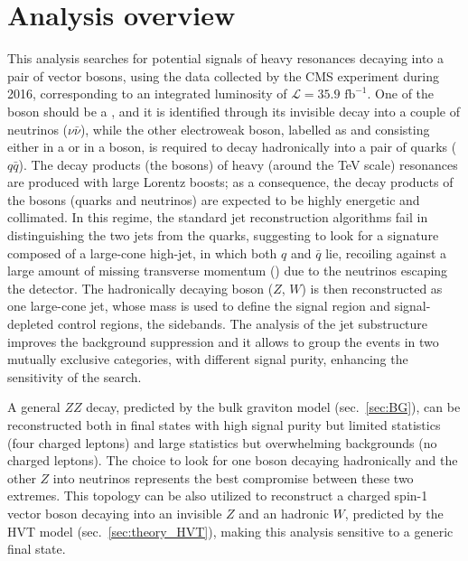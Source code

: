 \section{Analysis overview}
\label{sec:analysis_overview}

This analysis searches for potential signals of heavy resonances decaying into a pair of vector bosons, using the data collected by the CMS experiment during 2016, corresponding to an integrated luminosity of $\mathcal{L}=35.9 \mbox{ fb}^{-1}$. One of the boson should be a \Z, and it is identified through its invisible decay into a couple of neutrinos ($\nu \bar{\nu}$), while the other electroweak boson, labelled as \V and consisting either in a \W or in a \Z boson, is required to decay hadronically into a pair of quarks ($q \bar{q}$). %
The decay products (the bosons) of heavy (around the TeV scale) resonances are produced with large Lorentz boosts; as a consequence, the decay products of the bosons (quarks and neutrinos) are expected to be highly energetic and collimated. In this regime, the standard jet reconstruction algorithms fail in distinguishing the two jets from the quarks, suggesting to look for a signature composed of a large-cone high-\pt jet, in which both $q$ and $\bar{q}$ lie, recoiling against a large amount of missing transverse momentum (\met) due to the neutrinos escaping the detector. The hadronically decaying boson ($Z$, $W$) is then reconstructed as one large-cone jet, whose mass is used to define the signal region and signal-depleted control regions, the sidebands. %
The analysis of the jet substructure improves the background suppression and it allows to group the events in two mutually exclusive categories, with different signal purity, enhancing the sensitivity of the search.

\noindent A general $ZZ$ decay, predicted by the bulk graviton model (sec.~\ref{sec:BG}), can be reconstructed both in final states with high signal purity but limited statistics (four charged leptons) and large statistics but overwhelming backgrounds (no charged leptons). The choice to look for one boson decaying hadronically and the other $Z$ into neutrinos represents the best compromise between these two extremes. This topology can be also utilized to reconstruct a charged spin-1 vector boson \Wp decaying into an invisible $Z$ and an hadronic $W$, predicted by the HVT model (sec.~\ref{sec:theory_HVT}), making this analysis sensitive to a generic \VZ final state.

